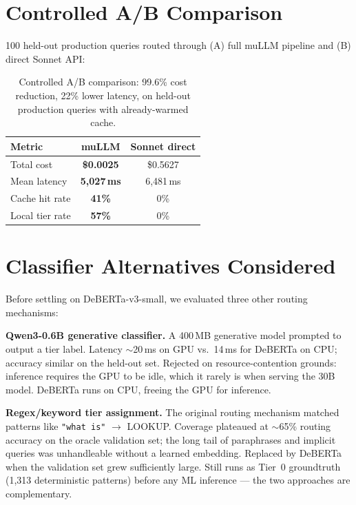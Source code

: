 \documentclass[11pt]{article}
\begin{document}
\section{Controlled A/B Comparison}

100 held-out production queries routed through (A) full muLLM pipeline
and (B) direct Sonnet API:

\begin{table}[h]
\centering
\small
\begin{tabular}{lcc}
\toprule
\textbf{Metric} & \textbf{muLLM} & \textbf{Sonnet direct} \\
\midrule
Total cost & \textbf{\$0.0025} & \$0.5627 \\
Mean latency & \textbf{5,027\,ms} & 6,481\,ms \\
Cache hit rate & \textbf{41\%} & 0\% \\
Local tier rate & \textbf{57\%} & 0\% \\
\bottomrule
\end{tabular}
\caption{Controlled A/B comparison: 99.6\% cost reduction, 22\% lower latency, on held-out production queries with already-warmed cache.}
\label{tab:ab}
\end{table}

\section{Classifier Alternatives Considered}
\label{sec:alternatives}

Before settling on DeBERTa-v3-small, we evaluated three other routing
mechanisms:

\textbf{Qwen3-0.6B generative classifier.} A 400\,MB generative model
prompted to output a tier label. Latency $\sim$20\,ms on GPU vs.\ 14\,ms
for DeBERTa on CPU; accuracy similar on the held-out set. Rejected on
resource-contention grounds: inference requires the GPU to be idle, which
it rarely is when serving the 30B model. DeBERTa runs on CPU, freeing the
GPU for inference.

\textbf{Regex/keyword tier assignment.} The original routing mechanism
matched patterns like \texttt{"what is"} $\to$ LOOKUP. Coverage plateaued
at $\sim$65\% routing accuracy on the oracle validation set; the long tail
of paraphrases and implicit queries was unhandleable without a learned
embedding. Replaced by DeBERTa when the validation set grew sufficiently
large. Still runs as Tier~0 groundtruth (1,313 deterministic patterns)
before any ML inference --- the two approaches are complementary.
\end{document}
